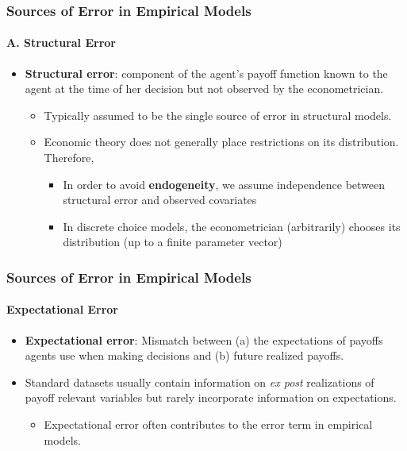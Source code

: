 \documentclass[notes=show]{beamer}
\begin{document}
\begin{frame}
\frametitle{Sources of Error in Empirical Models}
\framesubtitle{A. Structural Error}

\begin{itemize}
	\item \textbf{Structural error}: component of the agent's payoff function known to the agent at the time of her decision but not observed by the econometrician.	
	\pause
	\begin{itemize}
	\item Typically assumed to be the single source of error in structural models.
	\item Economic theory does not generally place restrictions on its distribution. Therefore,
	\pause
	\begin{itemize}
		\item In order to avoid \textbf{endogeneity}, we assume independence between structural error and observed covariates
		\item In discrete choice models, the econometrician (arbitrarily) chooses its distribution (up to a finite parameter vector)
	\end{itemize}
\end{itemize}
\end{itemize}
\end{frame}
\begin{frame}
\frametitle{Sources of Error in Empirical Models}
\framesubtitle{Expectational Error}

\begin{itemize}
	\item \textbf{Expectational error}: Mismatch between (a) the expectations of payoffs agents use when making decisions and (b) future realized payoffs.
	\item Standard datasets usually contain information on \textit{ex post} realizations of payoff relevant variables but rarely incorporate information on expectations.
	\begin{itemize}
		\item Expectational error often contributes to the error term in empirical models.
	\end{itemize}
\end{itemize}
\end{frame}
\end{document}
